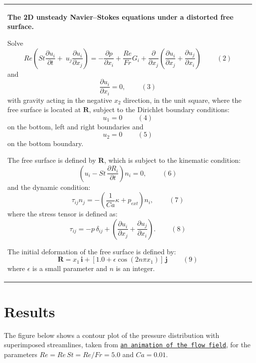 \begin{center} \tabulinesep=1mm
\begin{longtabu} spread 0pt [c]{*{1}{|X[-1]}|}
\hline
\begin{center} {\bfseries  The 2D unsteady Navier--Stokes equations under a distorted free surface.} \end{center}  Solve \[ Re\left(St\frac{\partial u_i}{\partial t} + \ u_j\frac{\partial u_i}{\partial x_j}\right) = - \frac{\partial p}{\partial x_i} + \frac{Re}{Fr}G_i + \frac{\partial }{\partial x_j} \left( \frac{\partial u_i}{\partial x_j} + \frac{\partial u_j}{\partial x_i} \right) \ \ \ \ \ \ \ \ \ \ (2) \] and \[ \frac{\partial u_i}{\partial x_i} = 0, \ \ \ \ \ \ \ \ \ \ (3) \] with gravity acting in the negative $ x_2 $ direction, in the unit square, where the free surface is located at $ \mathbf{R} $, subject to the Dirichlet boundary conditions\+: \[ u_1=0 \ \ \ \ \ \ \ \ \ \ (4) \] on the bottom, left and right boundaries and \[ u_2=0 \ \ \ \ \ \ \ \ \ \ (5) \] on the bottom boundary.

The free surface is defined by $ \mathbf{R} $, which is subject to the kinematic condition\+: \[ \left(u_i - St\, \frac{\partial R_i}{\partial t}\right) n_i = 0, \ \ \ \ \ \ \ \ \ \ (6) \] and the dynamic condition\+: \[ \tau_{ij}n_j = - \left(\frac{1}{Ca}\kappa + p_{ext}\right) n_i, \ \ \ \ \ \ \ \ \ \ (7) \] where the stress tensor is defined as\+: \[ \tau_{ij} = -p \, \delta_{ij} + \left(\frac{\partial u_i}{\partial x_j} + \frac{\partial u_j}{\partial x_i}\right). \ \ \ \ \ \ \ \ \ \ (8) \]

The initial deformation of the free surface is defined by\+: \[ \mathbf{R} = x_1 \, \mathbf{i} + \left[ 1.0 + \epsilon\cos\left( 2 n \pi x_1 \right)\right] \, \mathbf{j} \ \ \ \ \ \ \ \ \ \ (9) \] where $ \epsilon $ is a small parameter and $ n $ is an integer.   \\
\end{longtabu}
\end{center} 



 

\hypertarget{index_results}{}\section{Results}\label{index_results}
The figure below shows a contour plot of the pressure distribution with superimposed streamlines, taken from \href{../figures/single_layer.avi}{\tt an animation of the flow field}, for the parameters $ Re = Re \, St = Re/Fr = 5.0 $ and $ Ca = 0.01 $.

